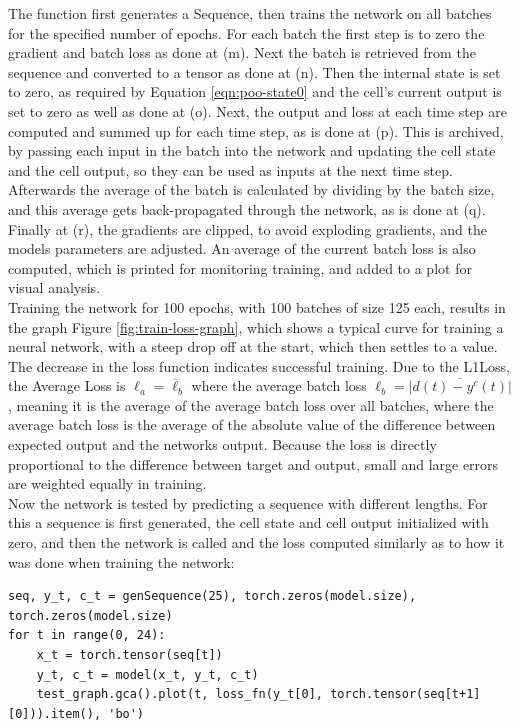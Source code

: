 \documentclass[twoside,a4paper,10pt,DIV=12,BCOR=12mm]{scrartcl}
\begin{document}
The function first generates a Sequence, then trains the network on all batches for the specified number of epochs. For each batch the first step is to zero the gradient and batch loss as done at (m). Next the batch is retrieved from the sequence and converted to a tensor as done at (n). Then the internal state is set to zero, as required by Equation \ref{eqn:poo-state0} and the cell's current output is set to zero as well as done at (o). Next, the output and loss at each time step are computed and summed up for each time step, as is done at (p). This is archived, by passing each input in the batch into the network and updating the cell state and the cell output, so they can be used as inputs at the next time step. Afterwards the average of the batch is calculated by dividing by the batch size, and this average gets back-propagated through the network, as is done at (q). Finally at (r), the gradients are clipped, to avoid exploding gradients, and the models parameters are adjusted. An average of the current batch loss is also computed, which is printed for monitoring training, and added to a plot for visual analysis.\cite{werb1990bptt, pytorch-rnn, gradient-clipping, pascanu2013rnntraining, hochreiter1997lstm}  
\\Training the network for 100 epochs, with 100 batches of size 125 each, results in the graph Figure \ref{fig:train-loss-graph}, which shows a typical curve for training a neural network, with a steep drop off at the start, which then settles to a value.\cite{training-graphs}
The decrease in the loss function indicates successful training. Due to the L1Loss, the Average Loss is \begin{math}\ell_a=\overline \ell_b\end{math} where the average batch loss \begin{math}\ell_b=\overline{\left|d(t)-y^c(t)\right|}\end{math}, meaning it is the average of the average batch loss over all batches, where the average batch loss is the average of the absolute value of the difference between expected output and the networks output. Because the loss is directly proportional to the difference between target and output, small and large errors are weighted equally in training.\\
Now the network is tested by predicting a sequence with different lengths. For this a sequence is first generated, the  cell state and cell output initialized with zero, and then the network is called and the loss computed similarly as to how it was done when training the network:
\begin{lstlisting}
seq, y_t, c_t = genSequence(25), torch.zeros(model.size), torch.zeros(model.size)
for t in range(0, 24):
    x_t = torch.tensor(seq[t])
    y_t, c_t = model(x_t, y_t, c_t)
    test_graph.gca().plot(t, loss_fn(y_t[0], torch.tensor(seq[t+1][0])).item(), 'bo')
\end{lstlisting}
\end{document}
